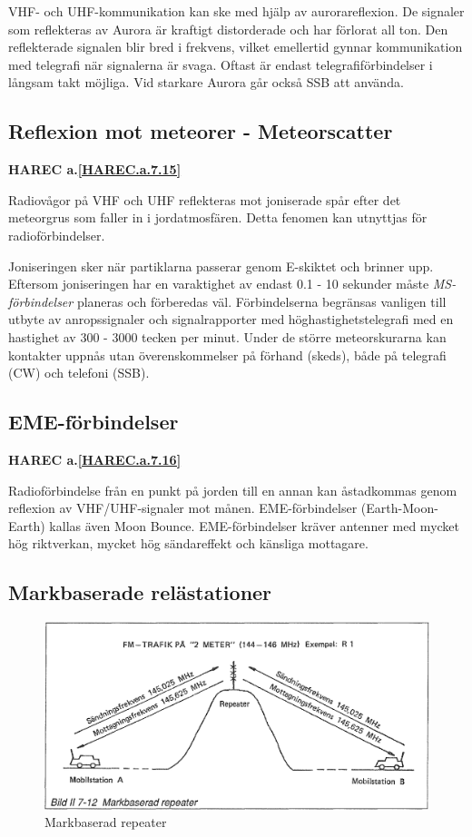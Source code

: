 VHF- och UHF-kommunikation kan ske med hjälp av aurorareflexion. De
signaler som reflekteras av Aurora är kraftigt distorderade och har
förlorat all ton. Den reflekterade signalen blir bred i frekvens,
vilket emellertid gynnar kommunikation med telegrafi när signalerna är
svaga. Oftast är endast telegrafiförbindelser i långsam takt möjliga.
Vid starkare Aurora går också SSB att använda.

\subsection{Reflexion mot meteorer - Meteorscatter}
\textbf{
HAREC a.\ref{HAREC.a.7.15}\label{myHAREC.a.7.15}
}

Radiovågor på VHF och UHF reflekteras mot joniserade spår efter det
meteorgrus som faller in i jordatmosfären. Detta fenomen kan utnyttjas
för radioförbindelser.

Joniseringen sker när partiklarna passerar genom E-skiktet och brinner
upp. Eftersom joniseringen har en varaktighet av endast 0.1 - 10
sekunder måste \emph{MS-förbindelser} planeras och förberedas
väl. Förbindelserna begränsas vanligen till utbyte av anropssignaler
och signalrapporter med höghastighetstelegrafi med en hastighet av 300
- 3000 tecken per minut. Under de större meteorskurarna kan kontakter
uppnås utan överenskommelser på förhand (skeds), både på telegrafi
(CW) och telefoni (SSB).

\subsection{EME-förbindelser}
\textbf{
HAREC a.\ref{HAREC.a.7.16}\label{myHAREC.a.7.16}
}

Radioförbindelse från en punkt på jorden till en annan kan åstadkommas
genom reflexion av VHF/UHF-signaler mot månen. EME-förbindelser
(Earth-Moon-Earth) kallas även Moon Bounce. EME-förbindelser kräver
antenner med mycket hög riktverkan, mycket hög sändareffekt och
känsliga mottagare.

\subsection{Markbaserade relästationer}

\begin{figure}
  \includegraphics[width=\textwidth]{images/bild_2_7-12}
  \caption{Markbaserad repeater}
  \label{fig:bildII7-12}
\end{figure}

